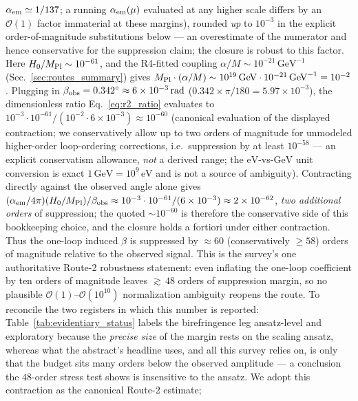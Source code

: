 \documentclass[aps,prd,twocolumn,superscriptaddress,showpacs,preprintnumbers,nofootinbib,longbibliography,floatfix]{revtex4-2}
\begin{document}
$\alpha_{\rm em}\simeq1/137$; a running $\alpha_{\rm em}(\mu)$ evaluated
at any higher scale differs by an $\mathcal{O}(1)$ factor immaterial at
these margins), rounded \emph{up} to $10^{-3}$ in the explicit
order-of-magnitude substitutions below --- an overestimate of the
numerator and hence conservative for the suppression claim; the
closure is robust to this factor. Here $H_0/M_{\rm Pl} \sim
10^{-61}$, and the R4-fitted coupling $\alpha/M \sim 10^{-21}\,\text{GeV}^{-1}$
(Sec.~\ref{sec:routes_summary}) gives $M_{\rm Pl}\cdot(\alpha/M) \sim 10^{19}\,\text{GeV} \cdot
10^{-21}\,\text{GeV}^{-1} = 10^{-2}$. Plugging in $\beta_{\rm obs}
= 0.342^\circ \approx 6\times 10^{-3}\,\text{rad}$
($0.342\times\pi/180 = 5.97\times 10^{-3}$), the dimensionless ratio
Eq.~\eqref{eq:r2_ratio} evaluates to
$10^{-3} \cdot 10^{-61}/(10^{-2}\cdot 6\times 10^{-3})\approx 10^{-60}$
(canonical evaluation of the displayed contraction; we conservatively
allow up to two orders of magnitude for unmodeled higher-order
loop-ordering corrections, i.e.\ suppression by at least $10^{-58}$ ---
an explicit conservatism allowance, \emph{not} a derived range; the
$\mathrm{eV}$-vs-$\mathrm{GeV}$ unit conversion is exact
$1\,\mathrm{GeV} = 10^9\,\mathrm{eV}$ and is not a source of
ambiguity).
Contracting directly against the observed angle alone gives
$(\alpha_{\rm em}/4\pi)(H_0/M_{\rm Pl})/\beta_{\rm obs}\approx
10^{-3}\cdot10^{-61}/(6\times10^{-3})\approx2\times10^{-62}$, \emph{two
additional orders} of suppression; the quoted $\sim10^{-60}$ is therefore
the conservative side of this bookkeeping choice, and the closure holds
a fortiori under either contraction. Thus the one-loop induced $\beta$ is suppressed by
${\approx}60$ (conservatively $\geq 58$) orders of magnitude relative
to the observed signal. This is the survey's one authoritative Route-2
robustness statement: even inflating the one-loop coefficient by ten
orders of magnitude leaves ${\gtrsim}\,48$ orders of suppression margin,
so no plausible $\mathcal{O}(1)$--$\mathcal{O}(10^{10})$ normalization
ambiguity reopens the route. To reconcile the two registers in which this
number is reported: Table~\ref{tab:evidentiary_status} labels the
birefringence leg ansatz-level and exploratory because the \emph{precise
size} of the margin rests on the scaling ansatz, whereas what the
abstract's headline uses, and all this survey relies on, is only that the
budget sits many orders below the observed amplitude --- a conclusion the
$48$-order stress test shows is insensitive to the ansatz. We adopt this contraction as the canonical Route-2 estimate;
\end{document}
